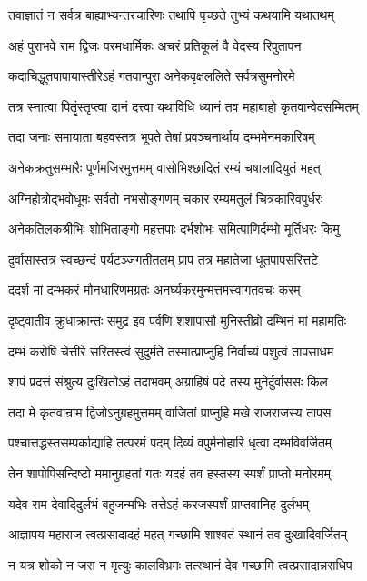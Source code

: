 \twolineshloka
{तवाज्ञातं न सर्वत्र बाह्याभ्यन्तरचारिणः}
{तथापि पृच्छते तुभ्यं कथयामि यथातथम्}%

\twolineshloka
{अहं पुराभवे राम द्विजः परमधार्मिकः}
{अचरं प्रतिकूलं वै वेदस्य रिपुतापन}%

\twolineshloka
{कदाचिद्धुतपापायास्तीरेऽहं गतवान्पुरा}
{अनेकवृक्षललिते सर्वत्रसुमनोरमे}%

\twolineshloka
{तत्र स्नात्वा पितॄंस्तृप्त्वा दानं दत्त्वा यथाविधि}
{ध्यानं तव महाबाहो कृतवान्वेदसम्मितम्}%

\twolineshloka
{तदा जनाः समायाता बहवस्तत्र भूपते}
{तेषां प्रवञ्चनार्थाय दम्भमेनमकारिषम्}%

\twolineshloka
{अनेकक्रतुसम्भारैः पूर्णमजिरमुत्तमम्}
{वासोभिश्छादितं रम्यं चषालादियुतं महत्}%

\twolineshloka
{अग्निहोत्रोद्भवोधूमः सर्वतो नभसोङ्गणम्}
{चकार रम्यमतुलं चित्रकारिवपुर्धरः}%

\twolineshloka
{अनेकतिलकश्रीभिः शोभिताङ्गो महत्तपाः}
{दर्भशोभः समित्पाणिर्दम्भो मूर्तिधरः किमु}%

\twolineshloka
{दुर्वासास्तत्र स्वच्छन्दं पर्यटञ्जगतीतलम्}
{प्राप तत्र महातेजा धूतपापसरित्तटे}%

\twolineshloka
{ददर्श मां दम्भकरं मौनधारिणमग्रतः}
{अनर्घ्यकरमुन्मत्तमस्वागतवचः करम्}%

\twolineshloka
{दृष्ट्वातीव क्रुधाक्रान्तः समुद्र इव पर्वणि}
{शशापासौ मुनिस्तीव्रो दम्भिनं मां महामतिः}%

\twolineshloka
{दम्भं करोषि चेत्तीरे सरितस्त्वं सुदुर्मते}
{तस्मात्प्राप्नुहि निर्वाच्यं पशुत्वं तापसाधम}%

\twolineshloka
{शापं प्रदत्तं संश्रुत्य दुःखितोऽहं तदाभवम्}
{अग्राहिषं पदे तस्य मुनेर्दुर्वाससः किल}%

\twolineshloka
{तदा मे कृतवान्राम द्विजोऽनुग्रहमुत्तमम्}
{वाजितां प्राप्नुहि मखे राजराजस्य तापस}%

\twolineshloka
{पश्चात्तद्धस्तसम्पर्काद्याहि तत्परमं पदम्}
{दिव्यं वपुर्मनोहारि धृत्वा दम्भविवर्जितम्}%

\twolineshloka
{तेन शापोपिसन्दिष्टो ममानुग्रहतां गतः}
{यदहं तव हस्तस्य स्पर्शं प्राप्तो मनोरमम्}%

\twolineshloka
{यदेव राम देवादिदुर्लभं बहुजन्मभिः}
{तत्तेऽहं करजस्पर्शं प्राप्तवानिह दुर्लभम्}%

\twolineshloka
{आज्ञापय महाराज त्वत्प्रसादादहं महत्}
{गच्छामि शाश्वतं स्थानं तव दुःखादिवर्जितम्}%

\twolineshloka
{न यत्र शोको न जरा न मृत्युः कालविभ्रमः}
{तत्स्थानं देव गच्छामि त्वत्प्रसादान्नराधिप}%

